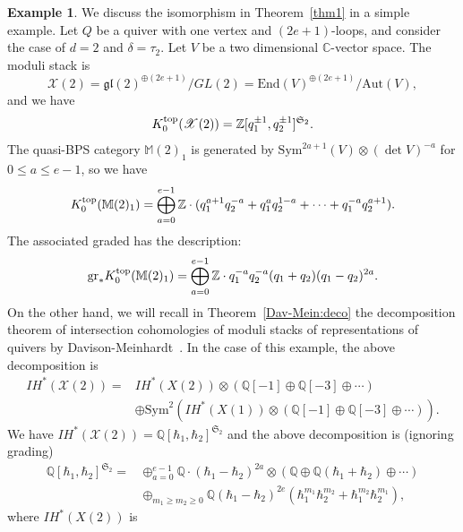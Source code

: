 \documentclass [11pt,oneside,a4paper,mathscr]{amsart}
\theoremstyle{definition}
\newtheorem{example}[thm]{Example}
\renewcommand{\leq}{\leqslant}
\renewcommand{\geq}{\geqslant}
\newcommand{\X}{\mathscr{X}}
\begin{document}
\begin{example}\label{exam:loop}
We discuss the isomorphism in Theorem~\ref{thm1} in a simple example. 
Let $Q$ be a quiver with one vertex and $(2e+1)$-loops, and 
consider the case of $d=2$ and $\delta=\tau_2$. Let $V$ be a two dimensional $\mathbb{C}$-vector space. 
The moduli stack is \[\X(2)=\mathfrak{gl}(2)^{\oplus (2e+1)}/GL(2)=\mathrm{End}(V)^{\oplus (2e+1)}/\mathrm{Aut}(V),\] 
and we have 
\begin{align*}
    K_0^{\rm{top}}(\X(2))=\mathbb{Z}[q_1^{\pm 1}, q_2^{\pm 1}]^{\mathfrak{S}_2}. 
\end{align*}
The quasi-BPS category $\mathbb{M}(2)_1$ is generated by 
$\mathrm{Sym}^{2a+1}(V) \otimes (\det V)^{-a}$ for $0\leq a\leq e-1$, 
so we have 
\begin{align*}
    K^{\rm{top}}_0(\mathbb{M}(2)_1)=\bigoplus_{a=0}^{e-1}
    \mathbb{Z}\cdot(q_1^{a+1} q_2^{-a}+q_1^{a}q_2^{1-a}+\cdots+q_1^{-a}q_2^{a+1}). 
\end{align*}
The associated graded has the description: 
\begin{align}\label{summandsgr}
     \mathrm{gr}_{\ast}K^{\rm{top}}_0(\mathbb{M}(2)_1)=
     \bigoplus_{a=0}^{e-1}\mathbb{Z}\cdot q_1^{-a}q_2^{-a}(q_1+q_2)(q_1-q_2)^{2a}. 
\end{align}
On the other hand, we will recall
in Theorem~\ref{Dav-Mein:deco}
the decomposition theorem of intersection cohomologies of 
moduli stacks of representations of quivers by Davison-Meinhardt~\cite{DM}. 
In the case of this example, the above decomposition is 
\begin{align*}
I\!H^{\ast}(\X(2))=&I\!H^{\ast}(X(2)) \otimes (\mathbb{Q}[-1]\oplus \mathbb{Q}[-3]\oplus \cdots ) \\
&\oplus \mathrm{Sym}^2(I\!H^{\ast}(X(1)) \otimes (\mathbb{Q}[-1] \oplus \mathbb{Q}[-3] \oplus \cdots)).
\end{align*}
We have $I\!H^{\ast}(\X(2))=\mathbb{Q}[\hbar_1, \hbar_2]^{\mathfrak{S}_2}$ and 
the above decomposition is 
(ignoring grading)
\begin{align*}
    \mathbb{Q}[\hbar_1, \hbar_2]^{\mathfrak{S}_2}=&\oplus_{a=0}^{e-1}\mathbb{Q}\cdot (\hbar_1-\hbar_2)^{2a}
    \otimes (\mathbb{Q}\oplus \mathbb{Q}(\hbar_1+\hbar_2) \oplus \cdots) \\
    &\oplus_{m_1 \geq m_2 \geq 0} \mathbb{Q}(\hbar_1-\hbar_2)^{2e}(\hbar_1^{m_1}\hbar_2^{m_2}+\hbar_1^{m_2}\hbar_2^{m_1}),  
\end{align*}
where $I\!H^{\ast}(X(2))$ is 
\begin{align}\label{summandsIH}

\end{align}
\end{example}
\end{document}
